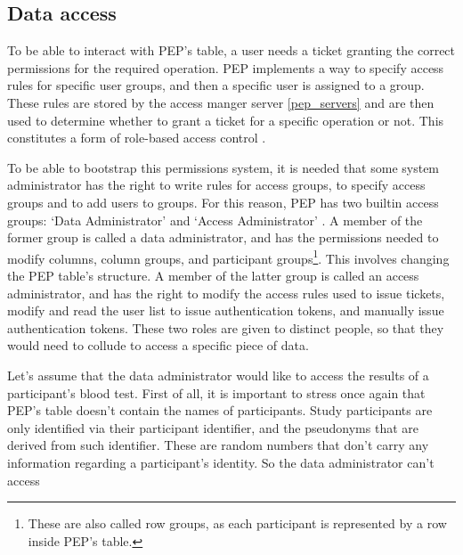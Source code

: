 \documentclass{report}
\begin{document}
\subsection{Data access} \label{data_access}
To be able to interact with PEP's table, a user needs a ticket granting the correct permissions for the required operation. PEP implements a way to specify access rules for
specific user groups, and then a specific user is assigned to a group. These rules are stored by the access manger server \ref{pep_servers} and are then used to determine whether to grant a ticket for a specific operation or not. This
constitutes a form of role-based access control \cite{rbac}. \par
To be able to bootstrap this permissions system, it is needed that some system administrator has the right to write rules for access groups, to specify access groups and to add users to groups. For 
this reason, PEP has two builtin access groups: \enquote*{Data Administrator} and \enquote*{Access Administrator} \cite{pep-blueprint}. A member of the former group is called a data administrator, and 
has the permissions needed to modify columns, column groups, and participant groups\footnote{These are also called row groups, as each participant is represented by a row inside
PEP's table.}. This involves changing the PEP table's structure. A member of the latter group is called an access administrator, and has the right to modify the 
access rules used to issue tickets, modify and read the user list to issue authentication tokens, and manually issue authentication tokens. These two roles are given to distinct people, 
so that they would need to collude to access a specific piece of data. \par
Let's assume that the data administrator would like to access the results of a participant's blood test. First of 
all, it is important to stress once again that PEP's table doesn't contain the names of participants. Study participants are only identified via their participant identifier, and the 
pseudonyms that are derived from such identifier. These are random numbers that don't carry any information regarding a participant's identity. So the data administrator can't access 
\end{document}
